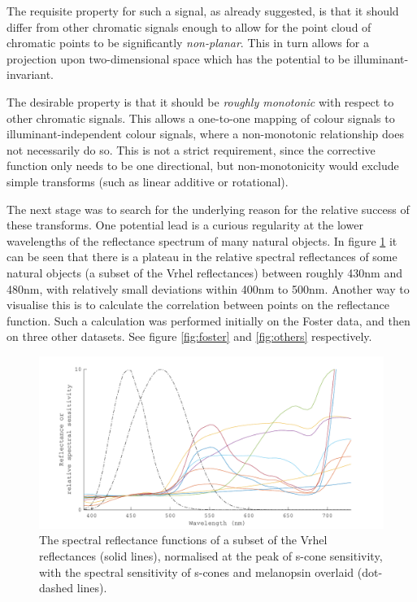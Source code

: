 The requisite property for such a signal, as already suggested, is that it should differ from other chromatic signals enough to allow for the point cloud of chromatic points to be significantly \emph{non-planar}. This in turn allows for a projection upon two-dimensional space which has the potential to be illuminant-invariant.

The desirable property is that it should be \emph{roughly monotonic} with respect to other chromatic signals. This allows a one-to-one mapping of colour signals to illuminant-independent colour signals, where a non-monotonic relationship does not necessarily do so. This is not a strict requirement, since the corrective function only needs to be one directional, but non-monotonicity would exclude simple transforms (such as linear additive or rotational).

The next stage was to search for the underlying reason for the relative success of these transforms. One potential lead is a curious regularity at the lower wavelengths of the reflectance spectrum of many natural objects. In figure \ref{fig:plateau} it can be seen that there is a plateau in the relative spectral reflectances of some natural objects (a subset of the Vrhel reflectances) between roughly 430nm and 480nm, with relatively small deviations within 400nm to 500nm. Another way to visualise this is to calculate the correlation between points on the reflectance function. Such a calculation was performed initially on the Foster data, and then on three other datasets. See figure \ref{fig:foster} and \ref{fig:others} respectively.

\begin{figure}[htbp]
 \includegraphics[max width=\textwidth]{figs/comp/melcomp_2_caller/plateau.pdf}
 \caption{The spectral reflectance functions of a subset of the Vrhel reflectances (solid lines), normalised at the peak of s-cone sensitivity, with the spectral sensitivity of s-cones and melanopsin overlaid (dot-dashed lines).}
 \label{fig:plateau}
\end{figure} 

